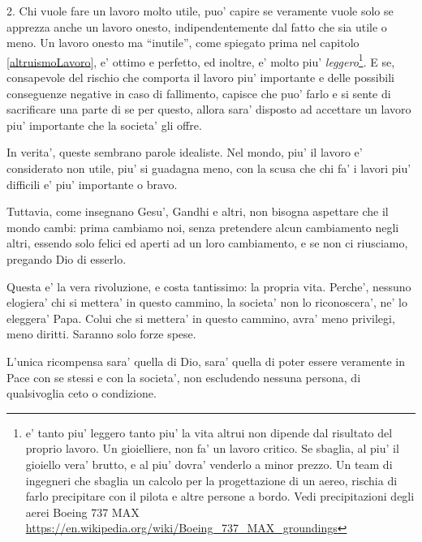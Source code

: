 2. Chi vuole fare un lavoro molto utile, puo' capire se veramente vuole solo se apprezza anche un lavoro onesto, indipendentemente dal fatto che sia utile o meno. Un lavoro onesto ma ``inutile'', come spiegato prima nel capitolo \ref{altruismoLavoro}, e' ottimo e perfetto, ed inoltre, e' molto piu' \emph{leggero}\footnote{e' tanto piu' leggero tanto piu' la vita altrui non dipende dal risultato del proprio lavoro. Un gioielliere, non fa' un lavoro critico. Se sbaglia, al piu' il gioiello vera' brutto, e al piu' dovra' venderlo a minor prezzo. Un team di ingegneri che sbaglia un calcolo per la progettazione di un aereo, rischia di farlo precipitare con il pilota e altre persone a bordo. Vedi precipitazioni degli aerei Boeing 737 MAX \url{https://en.wikipedia.org/wiki/Boeing\_737\_MAX\_groundings}}. 
E se, consapevole del rischio che comporta il lavoro piu' importante e delle possibili conseguenze negative in caso di fallimento, capisce che puo' farlo e si sente di sacrificare una parte di se per questo, allora sara' disposto ad accettare un lavoro piu' importante che la societa' gli offre.

In verita', queste sembrano parole idealiste. Nel mondo, piu' il lavoro e' considerato non utile, piu' si guadagna meno, con la scusa che chi fa' i lavori piu' difficili e' piu' importante o bravo.

Tuttavia, come insegnano Gesu', Gandhi e altri, non bisogna aspettare che il mondo cambi: prima cambiamo noi, senza pretendere alcun cambiamento negli altri, essendo solo felici ed aperti ad un loro cambiamento, e se non ci riusciamo, pregando Dio di esserlo.

Questa e' la vera rivoluzione, e costa tantissimo: la propria vita. Perche', nessuno elogiera' chi si mettera' in questo cammino, la societa' non lo riconoscera', ne' lo eleggera' Papa. Colui che si mettera' in questo cammino, avra' meno privilegi, meno diritti. Saranno solo forze spese. 

L'unica ricompensa sara' quella di Dio, sara' quella di poter essere veramente in Pace con se stessi e con la societa', non escludendo nessuna persona, di qualsivoglia ceto o condizione.

